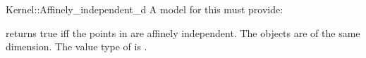 \begin{ccRefFunctionObjectConcept}{Kernel::Affinely_independent_d}
A model for this must provide:


 {returns
  true iff the points in \ccc{A = tuple [first,last)} are affinely
  independent.  \ccPrecond The objects are of the same dimension.
  \ccRequire The value type of  is
  .}

\end{ccRefFunctionObjectConcept}
